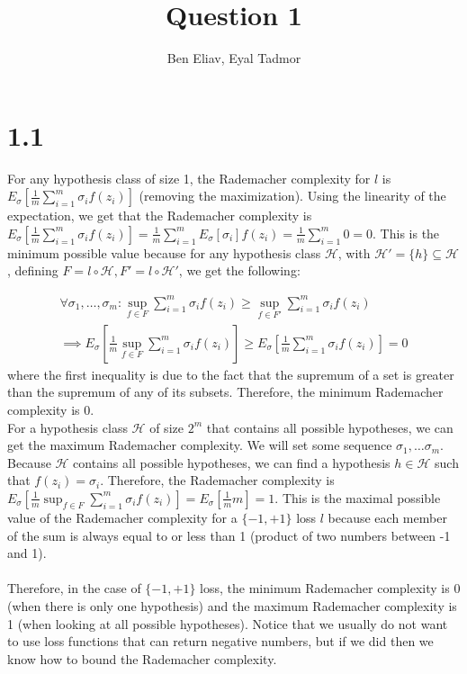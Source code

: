 \documentclass{article}
\title{Question 1}
\author{Ben Eliav, Eyal Tadmor}
\begin{document}
\maketitle

\section*{1.1}
For any hypothesis class of size 1, the Rademacher complexity for $l$ is $E_\sigma \left[ \frac{1}{m}\sum_{i=1}^m \sigma_i f(z_i) \right]$ (removing the maximization). Using the linearity of the expectation, we get that the Rademacher complexity is $E_\sigma \left[ \frac{1}{m}\sum_{i=1}^m \sigma_i f(z_i) \right] = \frac{1}{m}\sum_{i=1}^m E_\sigma \left[ \sigma_i \right]f(z_i) = \frac{1}{m}\sum_{i=1}^m 0 = 0$. This is the minimum possible value because for any hypothesis class $\mathcal{H}$, with $\mathcal{H}' = \{h\} \subseteq \mathcal{H}$, defining $F = l \circ \mathcal{H}, F' = l \circ \mathcal{H}'$, we get the following: 

\begin{gather*}
    \forall \sigma_1, \dots, \sigma_m: \sup_{f \in F}\sum_{i=1}^m \sigma_i f(z_i) \geq \sup_{f \in F'}\sum_{i=1}^m \sigma_i f(z_i)  \\
    \implies E_\sigma \left[ \frac{1}{m}\sup_{f \in F}\sum_{i=1}^m \sigma_i f(z_i) \right] \geq E_\sigma \left[ \frac{1}{m}\sum_{i=1}^m \sigma_i f(z_i) \right] = 0
\end{gather*}
where the first inequality is due to the fact that the supremum of a set is greater than the supremum of any of its subsets. Therefore, the minimum Rademacher complexity is 0.
\\ For a hypothesis class $\mathcal{H}$ of size $2^m$ that contains all possible hypotheses, we can get the maximum Rademacher complexity. We will set some sequence $\sigma_1, \dots \sigma_m$. Because $\mathcal{H}$ contains all possible hypotheses, we can find a hypothesis $h \in \mathcal{H}$ such that $f(z_i) = \sigma_i$. Therefore, the Rademacher complexity is $E_\sigma \left[ \frac{1}{m}\sup_{f \in F}\sum_{i=1}^m \sigma_i f(z_i) \right] = E_\sigma \left[ \frac{1}{m}m \right] = 1$. This is the maximal possible value of the Rademacher complexity for a $\{-1, +1\}$ loss $l$ because each member of the sum is always equal to or less than 1 (product of two numbers between -1 and 1).
\\ \\ Therefore, in the case of $\{-1, +1\}$ loss, the minimum Rademacher complexity is 0 (when there is only one hypothesis) and the maximum Rademacher complexity is 1 (when looking at all possible hypotheses). Notice that we usually do not want to use loss functions that can return negative numbers, but if we did then we know how to bound the Rademacher complexity.
\end{document}
